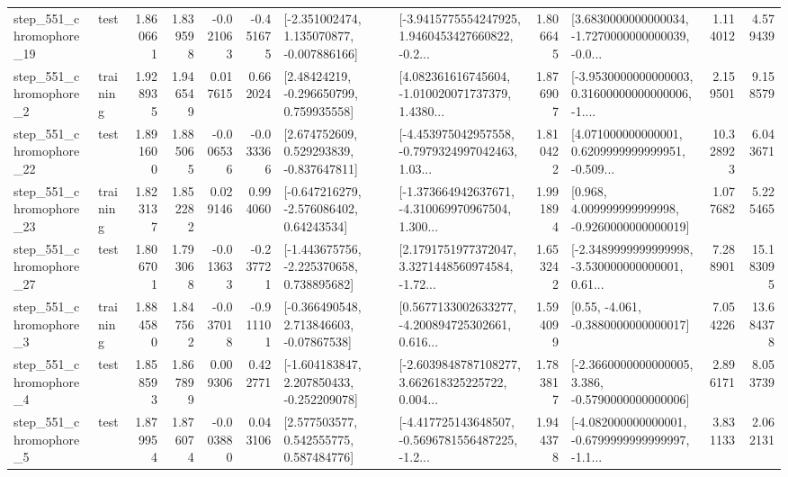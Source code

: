\begin{tabular}{llrrrrllrlrr}
  step\_551\_chromophore\_19 &      test &      1.860661 &    1.839598 &     -0.021063 & -0.451675 &   [-2.351002474, 1.135070877, -0.007886166] &  [-3.9415775554247925, 1.9460453427660822, -0.2... &       1.806645 &  [3.6830000000000034, -1.7270000000000039, -0.0... &            1.114012 &          4.579439 \\
   step\_551\_chromophore\_2 &  training &      1.928935 &    1.946549 &      0.017615 &  0.662024 &     [2.48424219, -0.296650799, 0.759935558] &  [4.082361616745604, -1.010020071737379, 1.4380... &       1.876907 &  [-3.9530000000000003, 0.31600000000000006, -1.... &            2.159501 &          9.158579 \\
  step\_551\_chromophore\_22 &      test &      1.891600 &    1.885065 &     -0.006536 & -0.033366 &    [2.674752609, 0.529293839, -0.837647811] &  [-4.453975042957558, -0.7979324997042463, 1.03... &       1.810422 &  [4.071000000000001, 0.6209999999999951, -0.509... &           10.328923 &          6.043671 \\
  step\_551\_chromophore\_23 &  training &      1.823137 &    1.852282 &      0.029146 &  0.994060 &    [-0.647216279, -2.576086402, 0.64243534] &  [-1.373664942637671, -4.310069970967504, 1.300... &       1.991894 &    [0.968, 4.009999999999998, -0.9260000000000019] &            1.077682 &          5.225465 \\
  step\_551\_chromophore\_27 &      test &      1.806701 &    1.793068 &     -0.013633 & -0.237721 &   [-1.443675756, -2.225370658, 0.738895682] &  [2.1791751977372047, 3.3271448560974584, -1.72... &       1.653242 &  [-2.3489999999999998, -3.530000000000001, 0.61... &            7.288901 &         15.183095 \\
   step\_551\_chromophore\_3 &  training &      1.884580 &    1.847562 &     -0.037018 & -0.911101 &    [-0.366490548, 2.713846603, -0.07867538] &  [0.5677133002633277, -4.200894725302661, 0.616... &       1.594099 &                [0.55, -4.061, -0.3880000000000017] &            7.054226 &         13.684378 \\
   step\_551\_chromophore\_4 &      test &      1.858593 &    1.867899 &      0.009306 &  0.422771 &   [-1.604183847, 2.207850433, -0.252209078] &  [-2.6039848787108277, 3.662618325225722, 0.004... &       1.783817 &  [-2.3660000000000005, 3.386, -0.5790000000000006] &            2.896171 &          8.053739 \\
   step\_551\_chromophore\_5 &      test &      1.879954 &    1.876074 &     -0.003880 &  0.043106 &     [2.577503577, 0.542555775, 0.587484776] &  [-4.417725143648507, -0.5696781556487225, -1.2... &       1.944378 &  [-4.082000000000001, -0.6799999999999997, -1.1... &            3.831133 &          2.062131 \\

\end{tabular}
